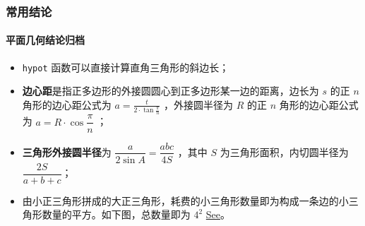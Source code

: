 \hypertarget{ux5e38ux7528ux7ed3ux8bba}{%
\subsubsection{常用结论}\label{ux5e38ux7528ux7ed3ux8bba}}

\hypertarget{ux5e73ux9762ux51e0ux4f55ux7ed3ux8bbaux5f52ux6863}{%
\paragraph{平面几何结论归档}\label{ux5e73ux9762ux51e0ux4f55ux7ed3ux8bbaux5f52ux6863}}

\begin{itemize}
\item
  \passthrough{\lstinline!hypot!} 函数可以直接计算直角三角形的斜边长；
\item
  \textbf{边心距}是指正多边形的外接圆圆心到正多边形某一边的距离，边长为 \(s\) 的正 \(n\) 角形的边心距公式为 \(\displaystyle a=\frac{t}{2\cdot\tan \frac{\pi}{n}}\) ，外接圆半径为 \(R\) 的正 \(n\) 角形的边心距公式为 \(a=R\cdot \cos \dfrac{\pi}{n}\) ；
\item
  \textbf{三角形外接圆半径}为 \(\dfrac{a}{2\sin A}=\dfrac{abc}{4S}\) ，其中 \(S\) 为三角形面积，内切圆半径为 \(\dfrac{2S}{a+b+c}\)；
\item
  由小正三角形拼成的大正三角形，耗费的小三角形数量即为构成一条边的小三角形数量的平方。如下图，总数量即为 \(4^2\) \href{https://codeforces.com/problemset/problem/559/A}{See}。


\end{itemize}

